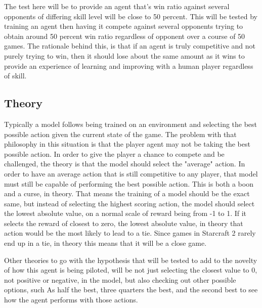 The test here will be to provide an agent that's win ratio against several opponents of differing skill level will be close to 50 percent. This will be tested by training an agent then having it compete against several opponents trying to obtain around 50 percent
win ratio regardless of opponent over a course of 50 games. The rationale behind this, is that if an agent is truly competitive and not purely trying to win, then it should lose about the same amount as it wins to provide an experience of learning and improving
with a human player regardless of skill. 


\subsection{Theory} 
\label{subsec:Theory}
Typically a model follows being trained on an environment and selecting the best possible action given the current state of the game. The problem with that philosophy in this situation is that the player agent may not be taking the best possible action. In order
to give the player a chance to compete and be challenged, the theory is that the model should select the "average" action. In order to have an average action that is still competitive to any player, that model must still be capable of performing the best possible
action. This is both a boon and a curse, in theory. That means the training of a model should be the exact same, but instead of selecting the highest scoring action, the model should select the lowest absolute value, on a normal scale of reward being from -1 to 1. 
If it selects the reward of closest to zero, the lowest absolute value, in theory that action would be the most likely to lead to a tie. Since games in Starcraft 2 rarely end up in a tie, in theory this means that it will be a close game. 

Other theories to go with the hypothesis that will be tested to add to the novelty of how this agent is being piloted, will be not just selecting the closest value to 0, not positive or negative, in the model, but also checking out other possible options, such As
half the best, three quarters the best, and the second best to see how the agent performs with those actions.